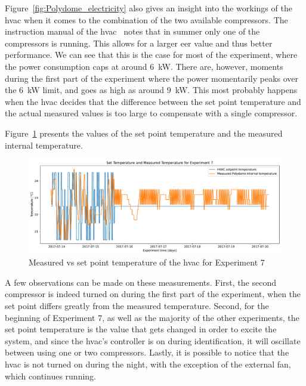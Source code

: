 Figure~\ref{fig:Polydome_electricity} also gives an insight into the workings of
the \acrshort{hvac} when it comes to the combination of the two available
compressors. The instruction manual of the
\acrshort{hvac}~\cite{aermecRoofTopManuelSelection} notes that in summer only
one of the compressors is running. This allows for a larger \acrshort{eer} value
and thus better performance. We can see that this is the case for most of the
experiment, where the power consumption caps at around 6~kW. There are, however,
moments during the first part of the experiment where the power momentarily
peaks over the 6~kW limit, and goes as high as around 9~kW. This most probably
happens when the \acrshort{hvac} decides that the difference between the set
point temperature and the actual measured values is too large to compensate with
a single compressor.

Figure~\ref{fig:Polydome_exp7_settemp} presents the values of the set point
temperature and the measured internal temperature. 

\begin{figure}[ht]
    \centering
    \includegraphics[width = \textwidth]{Plots/Exp_settemp.pdf}
    \caption{Measured vs set point temperature of the \acrshort{hvac} for Experiment 7}
    \label{fig:Polydome_exp7_settemp}
\end{figure}

A few observations can be made on these measurements. First, the second
compressor is indeed turned on during the first part of the experiment, when the
set point differs greatly from the measured temperature. Second, for the
beginning of Experiment 7, as well as the majority of the other experiments, the
set point temperature is the value that gets changed in order to excite the
system, and since the \acrshort{hvac}'s controller is on during identification,
it will oscillate between using one or two compressors. Lastly, it is possible
to notice that the \acrshort{hvac} is not turned on during the night, with the
exception of the external fan, which continues running.

